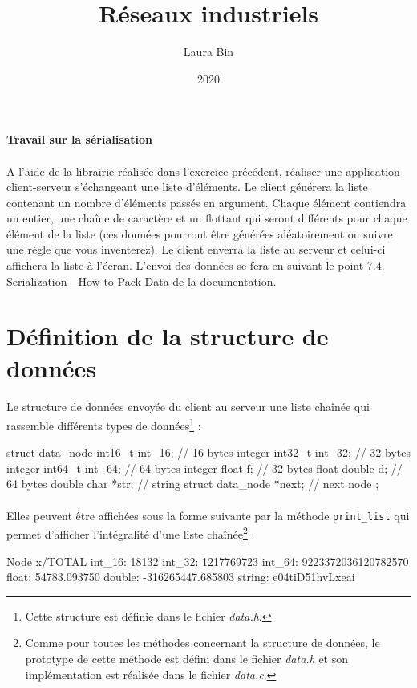 \documentclass{article}
\title{Réseaux industriels}
\date{2020}
\author{Laura Bin}
\begin{document}

    \begin{center}
        \textbf{\LARGE Travail sur la sérialisation}
    \end{center}

    \paragraph{}
    A l’aide de la librairie réalisée dans l’exercice précédent, réaliser une application client-serveur s’échangeant une liste d’éléments. Le client générera la liste contenant un nombre d’éléments passés en argument. Chaque élément contiendra un entier, une chaîne de caractère et un flottant qui seront différents pour chaque élément de la liste (ces données pourront être générées aléatoirement ou suivre une règle que vous inventerez). Le client enverra la liste au serveur et celui-ci affichera la liste à l’écran. L’envoi des données se fera en suivant le point \href{https://beej.us/guide/bgnet/html/#serialization}{7.4. Serialization—How to Pack Data} de la documentation.


    \section{Définition de la structure de données}
    \paragraph{}
    Le structure de données envoyée du client au serveur une liste chaînée qui rassemble différents types de données\footnote{Cette structure est définie dans le fichier \emph{data.h}.} :
    \begin{verbatimtab}
        struct data_node {
            int16_t int_16;             // 16 bytes integer
            int32_t int_32;             // 32 bytes integer
            int64_t int_64;             // 64 bytes integer
            float   f;                  // 32 bytes float
            double  d;                  // 64 bytes double
            char    *str;               // string
            struct data_node *next;     // next node
            };
    \end{verbatimtab}

    \paragraph{}
    Elles peuvent être affichées sous la forme suivante par la méthode \texttt{print\_list} qui permet d'afficher l'intégralité d'une liste chaînée\footnote{Comme pour toutes les méthodes concernant la structure de données, le prototype de cette méthode est défini dans le fichier \emph{data.h} et son implémentation est réalisée dans le fichier \emph{data.c}.} :
    \begin{verbatimtab}
        Node x/TOTAL {
            int_16: 18132
            int_32: 1217769723
            int_64: 9223372036120782570
            float:  54783.093750
            double: -316265447.685803
            string: e04tiD51hvLxeai
        }
    \end{verbatimtab}
\end{document}
